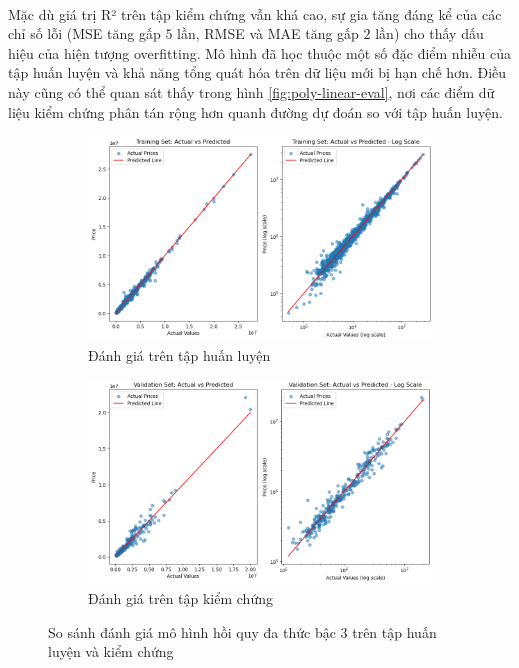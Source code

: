 \paragraph{}{Mặc dù giá trị R² trên tập kiểm chứng vẫn khá cao, sự gia tăng đáng kể của các chỉ số lỗi (MSE tăng gấp $5$ lần, RMSE và MAE tăng gấp $2$ lần) cho thấy dấu hiệu của hiện tượng overfitting. Mô hình đã học thuộc một số đặc điểm nhiễu của tập huấn luyện và khả năng tổng quát hóa trên dữ liệu mới bị hạn chế hơn. Điều này cũng có thể quan sát thấy trong hình \ref{fig:poly-linear-eval}, nơi các điểm dữ liệu kiểm chứng phân tán rộng hơn quanh đường dự đoán so với tập huấn luyện.}

\begin{figure}[H]
    \centering
    \begin{subfigure}[b]{1\textwidth} %
        \centering
        \includegraphics[width=\linewidth]{img/Poly_Training_Plot.png}
        \caption{Đánh giá trên tập huấn luyện}
        \label{fig:poly-linear-train-plot}
    \end{subfigure}

    \begin{subfigure}[b]{1\textwidth} %
        \centering
        \includegraphics[width=\linewidth]{img/Poly_Validation_Plot.png}
        \caption{Đánh giá trên tập kiểm chứng}
        \label{fig:poly-linear-valid-plot}
    \end{subfigure}
    \caption{So sánh đánh giá mô hình hồi quy đa thức bậc 3 trên tập huấn luyện và kiểm chứng}
    \label{fig:poly-linear-eval-plot}
\end{figure}

\pagebreak

